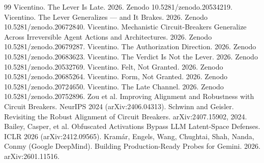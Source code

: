 \documentclass[11pt]{article}
\begin{document}
\begin{thebibliography}{99}\small
{} Vicentino. The Lever Is Late. 2026. Zenodo 10.5281/zenodo.20534219.
 Vicentino. The Lever Generalizes --- and It Brakes. 2026. Zenodo 10.5281/zenodo.20672840.
 Vicentino. Mechanistic Circuit-Breakers Generalize Across Irreversible Agent Actions and Architectures. 2026. Zenodo 10.5281/zenodo.20679287.
 Vicentino. The Authorization Direction. 2026. Zenodo 10.5281/zenodo.20683623.
 Vicentino. The Verdict Is Not the Lever. 2026. Zenodo 10.5281/zenodo.20532769.
 Vicentino. Felt, Not Granted. 2026. Zenodo 10.5281/zenodo.20685264.
 Vicentino. Form, Not Granted. 2026. Zenodo 10.5281/zenodo.20724650.
 Vicentino. The Late Channel. 2026. Zenodo 10.5281/zenodo.20752896.
 Zou et al. Improving Alignment and Robustness with Circuit Breakers. NeurIPS 2024 (arXiv:2406.04313).
 Schwinn and Geisler. Revisiting the Robust Alignment of Circuit Breakers. arXiv:2407.15902, 2024.
 Bailey, Casper, et al. Obfuscated Activations Bypass LLM Latent-Space Defenses. ICLR 2026 (arXiv:2412.09565).
 Kram\'ar, Engels, Wang, Chughtai, Shah, Nanda, Conmy (Google DeepMind). Building Production-Ready Probes for Gemini. 2026. arXiv:2601.11516.
\end{thebibliography}
\end{document}
